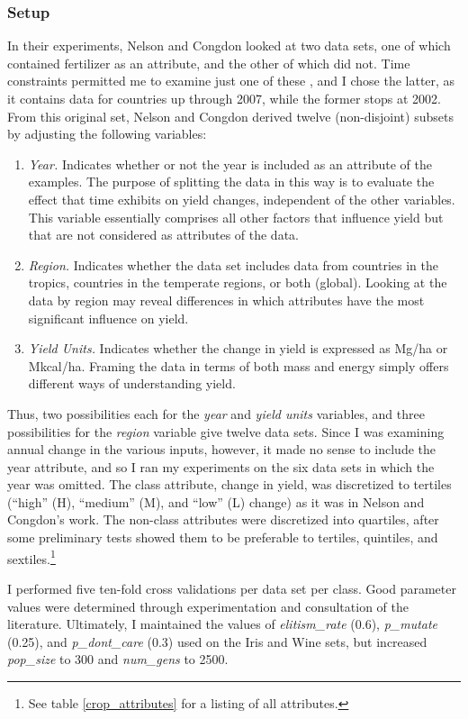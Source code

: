 \documentclass[12pt,twoside]{article}
\begin{document}
\subsubsection{Setup}
In their experiments, Nelson and Congdon looked at two data sets, one of which contained fertilizer as an attribute, and the other of which did not. Time constraints permitted me to examine just one of these , and I chose the latter, as it contains data for countries up through 2007, while the former stops at 2002. From this original set, Nelson and Congdon derived twelve (non-disjoint) subsets by adjusting the following variables:
\begin{enumerate}
\item \textit{Year.} Indicates whether or not the year is included as an attribute of the examples. The purpose of splitting the data in this way is to evaluate the effect that time exhibits on yield changes, independent of the other variables. This variable essentially comprises all other factors that influence yield but that are not considered as attributes of the data.
\item \textit{Region.} Indicates whether the data set includes data from countries in the tropics, countries in the temperate regions, or both (global). Looking at the data by region may reveal differences in which attributes have the most significant influence on yield.
\item \textit{Yield Units.} Indicates whether the change in yield is expressed as Mg/ha or Mkcal/ha. Framing the data in terms of both mass and energy simply offers different ways of understanding yield.
\end{enumerate}
Thus, two possibilities  each for the \textit{year} and \textit{yield units} variables, and three possibilities for the \textit{region} variable give twelve data sets. Since I was examining annual change in the various inputs, however, it made no sense to include the year attribute, and so I ran my experiments on the six data sets in which the year was omitted. The class attribute, change in yield, was discretized to tertiles (``high'' (H), ``medium'' (M), and ``low'' (L) change) as it was in Nelson and Congdon's work. The non-class attributes were discretized into quartiles, after some preliminary tests showed them to be preferable to tertiles, quintiles, and sextiles.\footnote{See table \ref{crop_attributes} for a listing of all attributes.}

I performed five ten-fold cross validations per data set per class. Good parameter values were determined through experimentation and consultation of the literature. Ultimately, I maintained the values of \textit{elitism\_rate} (0.6), \textit{p\_mutate} (0.25), and \textit{p\_dont\_care} (0.3) used on the Iris and Wine sets, but increased \textit{pop\_size} to 300 and \textit{num\_gens} to 2500.
\end{document}

